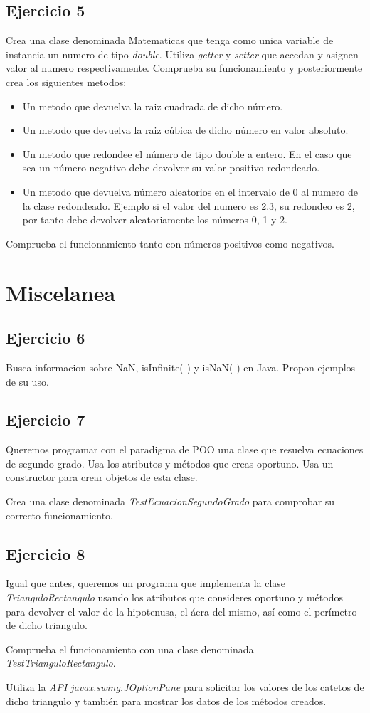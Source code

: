 \documentclass[4paper]{article}
\begin{document}
\subsection{Ejercicio 5}
Crea una clase denominada Matematicas que tenga como unica variable de instancia un numero de tipo \emph{double}. Utiliza \emph{getter} y \emph{setter} que accedan y asignen valor al numero respectivamente. Comprueba su funcionamiento y posteriormente crea los siguientes metodos:
\begin{itemize}
\item Un metodo que devuelva la raiz cuadrada de dicho número.
\item Un metodo que devuelva la raiz cúbica de dicho número en valor absoluto. 
\item Un metodo que redondee el número de tipo double a entero. En el caso que sea un número negativo debe devolver su valor positivo redondeado.
\item Un metodo que devuelva número aleatorios en el intervalo de 0 al numero de la clase redondeado. Ejemplo si el valor del numero es 2.3, su redondeo es 2, por tanto debe devolver aleatoriamente los números 0, 1 y 2.
\end{itemize} 
Comprueba el funcionamiento tanto con números positivos como negativos.

\section{Miscelanea}
\subsection{Ejercicio 6}
Busca informacion sobre NaN, isInfinite( ) y isNaN( ) en Java. Propon ejemplos de su uso.
\subsection{Ejercicio 7}
Queremos programar con el paradigma de POO una clase que resuelva ecuaciones de segundo grado. Usa los atributos y métodos que creas oportuno. Usa un constructor para crear objetos de esta clase.\par 
Crea una clase denominada \emph{TestEcuacionSegundoGrado} para comprobar su correcto funcionamiento. 
\subsection{Ejercicio 8} 
Igual que antes, queremos un programa que implementa la clase \emph{TrianguloRectangulo} usando los atributos que consideres oportuno y métodos para devolver el valor de la hipotenusa, el áera del mismo, así como el perímetro de dicho triangulo.\par 
Comprueba el funcionamiento con una clase denominada \emph{TestTrianguloRectangulo}.\par 
Utiliza la \emph{API javax.swing.JOptionPane} para solicitar los valores de los catetos de dicho triangulo y también para mostrar los datos de los métodos creados.
\end{document}
